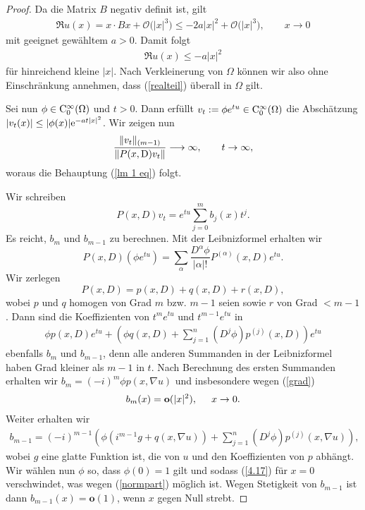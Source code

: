 \begin{proof}
Da die Matrix $B$ negativ definit ist, gilt
\begin{align*}
\Re u(x) = x\cdot Bx + \mathcal O\big(|x|^3\big) \le - 2 a |x|^2 + \mathcal O\big(|x|^3\big),\qquad x\to0
\end{align*}
mit geeignet gewähltem $a>0$. Damit folgt
\begin{align}
\label{realteil}
\Re u(x) \le - a |x|^2 
\end{align}
für hinreichend kleine $|x|$. Nach Verkleinerung von $\Omega$ können wir also ohne Einschränkung annehmen, dass (\ref{realteil}) überall in $\Omega$ gilt. 

Sei nun $\phi \in \mathrm C_0^\infty(\Omega)$ und $t>0$. Dann erfüllt $v_t := \phi e^{tu} \in \mathrm C_0^\infty(\Omega)$ die Abschätzung $|v_t(x)| \le |\phi(x)| \mathrm e^{-at|x|^2}$. Wir zeigen nun
\[
\frac{\lVert v_t \rVert_{(m-1)}}{\lVert P(x,\mathrm D)v_t \rVert} \longrightarrow \infty, \qquad t \rightarrow \infty,
\]
woraus die Behauptung (\ref{lm 1 eq}) folgt.

Wir schreiben 
\[
P(x,D)v_t = e^{tu} \sum_{j=0}^{m} b_j(x) t^j.
\]
Es reicht, $b_m$ und $b_{m-1}$ zu berechnen. Mit der Leibnizformel erhalten wir
\[
P(x,D)(\phi e^{tu}) = \sum_{\alpha} \dfrac{D^\alpha \phi}{|\alpha|!} P^{(\alpha)}(x,D)e^{tu}.
\]
Wir zerlegen
\[
P(x,D) = p(x,D) + q(x,D) + r(x,D),
\]
wobei $p$ und $q$ homogen von Grad $m$ bzw. $m-1$ seien sowie $r$ von Grad $<m-1$. Dann sind die Koeffizienten von $t^m e^{tu}$ und $t^{m-1} e^{tu}$ in
\begin{align}
\phi p(x,D)e^{tu} + \left( \phi q(x,D) + \sum_{j=1}^{n} (D^j \phi) p^{(j)}(x,D) \right) e^{tu}
\end{align}
ebenfalls $b_m$ und $b_{m-1}$, denn alle anderen Summanden in der Leibnizformel haben Grad kleiner als $m-1$ in $t$. Nach Berechnung des ersten Summanden erhalten wir $b_m = (-i)^m \phi p(x,\nabla u)$ und insbesondere wegen (\ref{grad})
\begin{align}
b_m(x) = \textbf{o} (|x|^2), \hspace{0.5cm} x \rightarrow 0.
\end{align}
Weiter erhalten wir
\begin{align}
	\label{4.17}
b_{m-1} = (-i)^{m-1} \left( \phi (i^{m-1}g + q(x,\nabla u)) + \sum_{j=1}^{n} (D^j \phi) p^{(j)} (x,\nabla u) \right),
\end{align}
wobei $g$ eine glatte Funktion ist, die von $u$ und den Koeffizienten von $p$ abhängt. Wir wählen nun $\phi$ so, dass $\phi(0) =1$ gilt und sodass (\ref{4.17}) für $x=0$ verschwindet, was wegen (\ref{normpart}) möglich ist. Wegen Stetigkeit von $b_{m-1}$ ist dann $b_{m-1}(x) = \textbf{o}(1)$, wenn $x$ gegen Null strebt.


\end{proof}
